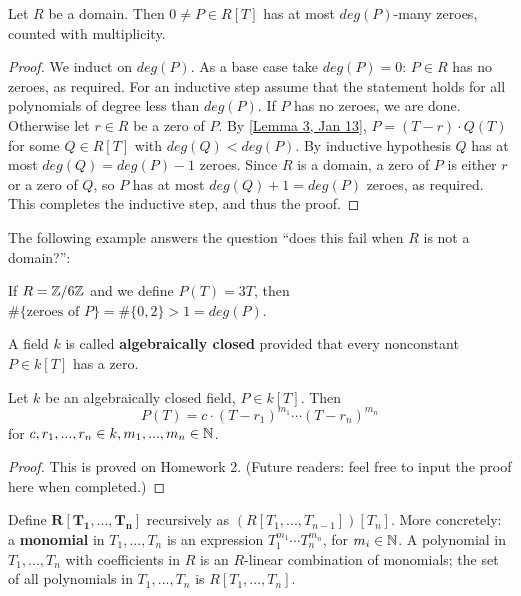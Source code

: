 \begin{cor} \label{Cor 1, Jan 18}
Let $R$ be a domain. Then $0 \neq P \in R[T]$ has at most $deg(P)$-many zeroes, counted with multiplicity.
\end{cor}
\begin{proof}
We induct on $deg(P)$. As a base case take $deg(P) = 0$: $P \in R$ has no zeroes, as required. For an inductive step assume that the statement holds for all polynomials of degree less than $deg(P)$. If $P$ has no zeroes, we are done. Otherwise let $r \in R$ be a zero of $P$. By \ref{Lemma 3, Jan 13}, $P = (T - r) \cdot Q(T)$ for some $Q \in R[T]$ with $deg(Q) < deg(P)$. By inductive hypothesis $Q$ has at most $deg(Q) = deg(P) - 1$ zeroes. Since $R$ is a domain, a zero of $P$ is either $r$ or a zero of $Q$, so $P$ has at most $deg(Q) + 1 = deg(P)$ zeroes, as required. This completes the inductive step, and thus the proof.
\end{proof}
The following example answers the question ``does this fail when $R$ is not a domain?'':
\begin{ex}
If $R = \mathbb{Z} / 6\mathbb{Z}$ and we define $P(T) = 3T$, then $\#\{ \text{zeroes of } P \} = \#\{0, 2\} > 1 = deg(P)$.
\end{ex}

\begin{defn} \label{Defn 2, Jan 18}
A field $k$ is called \textbf{algebraically closed} provided that every nonconstant $P \in k[T]$ has a zero.
\end{defn}

\begin{prop} \label{Prop 3, Jan 18}
Let $k$ be an algebraically closed field, $P \in k[T]$. Then
\[P(T) = c \cdot (T - r_1)^{m_1} \cdots (T - r_n)^{m_n}\]
for $c, r_1, ..., r_n \in k, m_1, ..., m_n \in \mathbb{N}$.
\end{prop}

\begin{proof}
This is proved on Homework 2. (Future readers: feel free to input the proof here when completed.)
\end{proof}

\begin{defn} \label{Defn 4, Jan 18}
Define $\mathbf{R[T_1, ..., T_n]}$ recursively as $(R[T_1, ..., T_{n-1}])[T_n]$. More concretely: a \textbf{monomial} in $T_1, ..., T_n$ is an expression $T_1^{m_1} \cdots T_n^{m_n}$, for $m_i \in \mathbb{N}$. A polynomial in $T_1, ..., T_n$ with coefficients in $R$ is an $R$-linear combination of monomials; the set of all polynomials in $T_1, ..., T_n$ is $R[T_1, ..., T_n]$.
\end{defn}


